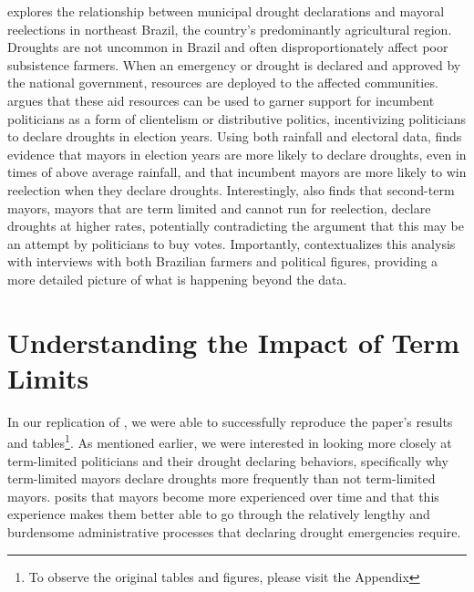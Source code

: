 \documentclass[12pt]{article}
\begin{document}
\citet{cooperman2021natural} explores the relationship between municipal
drought declarations and mayoral reelections in northeast Brazil, the
country's predominantly agricultural region. Droughts are not uncommon
in Brazil and often disproportionately affect poor subsistence farmers.
When an emergency or drought is declared and approved by the national
government, resources are deployed to the affected communities.
\citet{cooperman2021natural} argues that these aid resources can be used
to garner support for incumbent politicians as a form of clientelism or
distributive politics, incentivizing politicians to declare droughts in
election years. Using both rainfall and electoral data,
\citet{cooperman2021natural} finds evidence that mayors in election
years are more likely to declare droughts, even in times of above
average rainfall, and that incumbent mayors are more likely to win
reelection when they declare droughts. Interestingly,
\citet{cooperman2021natural} also finds that second-term mayors, mayors
that are term limited and cannot run for reelection, declare droughts at
higher rates, potentially contradicting the argument that this may be an
attempt by politicians to buy votes. Importantly,
\citet{cooperman2021natural} contextualizes this analysis with
interviews with both Brazilian farmers and political figures, providing
a more detailed picture of what is happening beyond the data.

\section{Understanding the Impact of Term Limits}
\label{sec:term_limit}

In our replication of \citet{cooperman2021natural}, we were able to
successfully reproduce the paper's results and tables\footnote{To
  observe the original tables and figures, please visit the Appendix}.
As mentioned earlier, we were interested in looking more closely at
term-limited politicians and their drought declaring behaviors,
specifically why term-limited mayors declare droughts more frequently
than not term-limited mayors. \citet{cooperman2021natural} posits that
mayors become more experienced over time and that this experience makes
them better able to go through the relatively lengthy and burdensome
administrative processes that declaring drought emergencies require.
\end{document}
